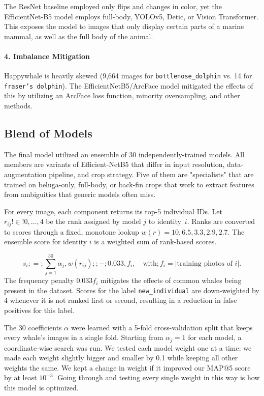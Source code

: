 \documentclass[twocolumn]{article}
\begin{document}
The ResNet baseline employed only flips and changes in color, yet the EfficientNet-B5 model employs full-body, YOLOv5, Detic, or Vision Transformer. This exposes the model to images that only display certain parts of a marine mammal, as well as the full body of the animal. 

\paragraph{4. Imbalance Mitigation}

Happywhale is heavily skewed (9,664 images for \texttt{bottlenose_dolphin} vs. 14 for \texttt{fraser's dolphin}). The EfficientNetB5/ArcFace model mitigated the effects of this by utilizing an ArcFace loss function, minority oversampling, and other methods. 

\subsection{Blend of Models}

The final model utilized an ensemble of 30 independently-trained models. All members are variants of Efficient-NetB5 that differ in input resolution, data-augmentation pipeline, and crop strategy. Five of them are "specialists" that are trained on beluga-only, full-body, or back-fin crops that work to extract features from ambiguities that generic models often miss.

For every image, each component returns its top-5 individual IDs. Let $r_{ij}!\in!{0,\dots,4}$ be the rank assigned by model $j$ to identity~$i$. Ranks are converted to scores through a fixed, monotone lookup $w(r)={10,6.5,3.3,2.9,2.7}$. The ensemble score for identity $i$ is a weighted sum of rank-based scores.

\begin{equation}
s_i;=;\sum_{j=1}^{30} \alpha_j,w(r_{ij});;{-};0.033,f_i,\quad\text{with};f_i=|{\text{training photos of }i}|.
\end{equation}
The frequency penalty $0.033 f_i$ mitigates the effects of common whales being present in the dataset. Scores for the label \texttt{new_individual} are down-weighted by 4 whenever it is not ranked first or second, resulting in a reduction in false positives for this label. 

The 30 coefficients ${\alpha}$ were learned with a 5-fold cross-validation split that keeps every whale's images in a single fold. Starting from $\alpha_j = 1$ for each model, a coordinate-wise search was run. We tested each model weight one at a time: we made each weight slightly bigger and smaller by 0.1 while keeping all other weights the same. We kept a change in weight if it improved our MAP@5 score by at least $10^{-3}$. Going through and testing every single weight in this way is how this model is optimized.
\end{document}
